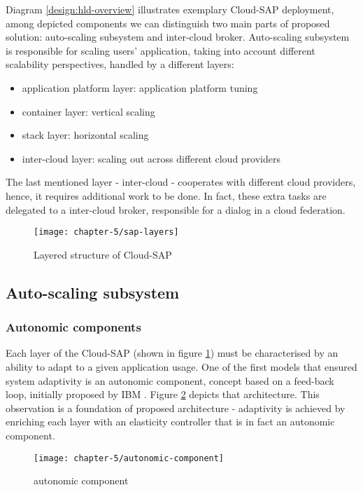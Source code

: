 Diagram \ref{design:hld-overview} illustrates exemplary Cloud-SAP deployment, among depicted components we can distinguish two main parts of proposed solution: auto-scaling subsystem and inter-cloud broker. Auto-scaling subsystem is responsible for scaling users' application, taking into account different scalability perspectives, handled by a different layers:
\begin{itemize}
	\item application platform layer: application platform tuning
	\item container layer: vertical scaling
	\item stack layer: horizontal scaling
	\item inter-cloud layer: scaling out across different cloud providers
\end{itemize}
The last mentioned layer - inter-cloud - cooperates with different cloud providers, hence, it requires additional work to be done. In fact, these extra tasks are delegated to a inter-cloud broker, responsible for a dialog in a cloud federation.

\begin{figure}[!ht]
  \begin{center}
    \texttt{[image: chapter-5/sap-layers]}
  \end{center}
  \caption{Layered structure of Cloud-SAP}
  \label{design:csap-layers}
\end{figure}

\subsection{Auto-scaling subsystem}

\subsubsection{Autonomic components}
Each layer of the Cloud-SAP (shown in figure \ref{design:csap-layers}) must be characterised by an ability to adapt to a given application usage. One of the first models that ensured system adaptivity is an autonomic component, concept based on a feed-back loop, initially proposed by IBM \cite{IBM06}. Figure \ref{design:autonomic-component} depicts that architecture. This observation is a foundation of proposed architecture - adaptivity is achieved by enriching each layer with an elasticity controller that is in fact an autonomic component.

\begin{figure}[!ht]
  \begin{center}
    \texttt{[image: chapter-5/autonomic-component]}
  \end{center}
  \caption{autonomic component}
  \label{design:autonomic-component}
\end{figure}

